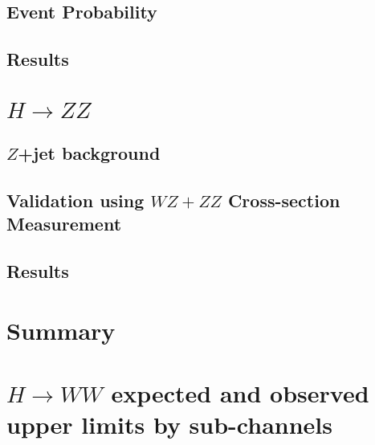 \documentclass{cmspaper}
\begin{document}
\subsection{Event Probability}
\label{sec:Evt_Prob}



\subsection{Results}
\label{results_hww}


\clearpage

\section{$H \rightarrow ZZ$ }
\label{sec:hzzintro}


\subsection{$Z$+jet background}
\label{sec:hzzbkg_zjets}


\subsection{Validation using $WZ+ZZ$ Cross-section Measurement}
\label{sec:vzvalidation}



\subsection{Results}
\label{sec:results_hzz}

\clearpage


\section{Summary}
\label{sec:summary}


\clearpage

\appendix


 \section{$H\to WW$ expected and observed upper limits by sub-channels}
     \label{app:hwwsubchannels}
     



 
\end{document}
